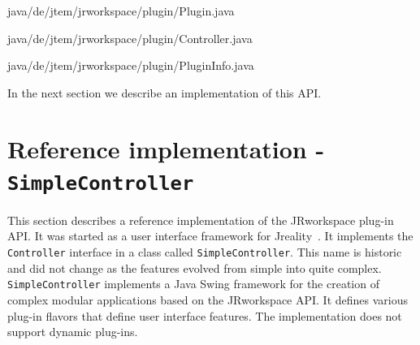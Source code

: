 \documentclass[Thesis.tex]{subfiles}
\begin{document}
 {java/de/jtem/jrworkspace/plugin/Plugin.java}

 {java/de/jtem/jrworkspace/plugin/Controller.java}

 {java/de/jtem/jrworkspace/plugin/PluginInfo.java}

In the next section we describe an implementation of this API.

\section{Reference implementation - {\tt SimpleController}}
\label{sec:reference_implementation}
This section describes a reference implementation of the {\sc JRworkspace} plug-in API.
It was started as a user interface framework for {\sc Jreality}~\cite{JrealityWebsite}. It implements
the {\tt Controller} interface in a class called {\tt SimpleController}. This name is historic
and did not change as the features evolved from simple into quite complex.
{\tt SimpleController} implements a {\sc Java Swing\TReg} framework for the creation of complex
modular applications based on the {\sc JRworkspace} API. It defines various plug-in flavors
that define user interface features. The implementation does not support dynamic plug-ins.
\end{document}
